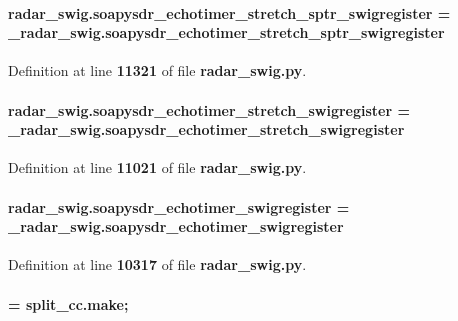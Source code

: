 \paragraph[{soapysdr\+\_\+echotimer\+\_\+stretch\+\_\+sptr\+\_\+swigregister}]{\setlength{\rightskip}{0pt plus 5cm}radar\+\_\+swig.\+soapysdr\+\_\+echotimer\+\_\+stretch\+\_\+sptr\+\_\+swigregister = \+\_\+radar\+\_\+swig.\+soapysdr\+\_\+echotimer\+\_\+stretch\+\_\+sptr\+\_\+swigregister}\label{namespaceradar__swig_aa3d3c8d166876da641c7e2de99587cc3}


Definition at line {\bf 11321} of file {\bf radar\+\_\+swig.\+py}.

\paragraph[{soapysdr\+\_\+echotimer\+\_\+stretch\+\_\+swigregister}]{\setlength{\rightskip}{0pt plus 5cm}radar\+\_\+swig.\+soapysdr\+\_\+echotimer\+\_\+stretch\+\_\+swigregister = \+\_\+radar\+\_\+swig.\+soapysdr\+\_\+echotimer\+\_\+stretch\+\_\+swigregister}\label{namespaceradar__swig_a9219efcaf7001436a1aded50c6907460}


Definition at line {\bf 11021} of file {\bf radar\+\_\+swig.\+py}.

\paragraph[{soapysdr\+\_\+echotimer\+\_\+swigregister}]{\setlength{\rightskip}{0pt plus 5cm}radar\+\_\+swig.\+soapysdr\+\_\+echotimer\+\_\+swigregister = \+\_\+radar\+\_\+swig.\+soapysdr\+\_\+echotimer\+\_\+swigregister}\label{namespaceradar__swig_aac404a575f071f3bbd54b61c9583e43d}


Definition at line {\bf 10317} of file {\bf radar\+\_\+swig.\+py}.

\paragraph[{split\+\_\+cc}]{ = {\bf split\+\_\+cc.\+make};}\label{namespaceradar__swig_a7f2f727a9540607f8ac494787c3ae912}


